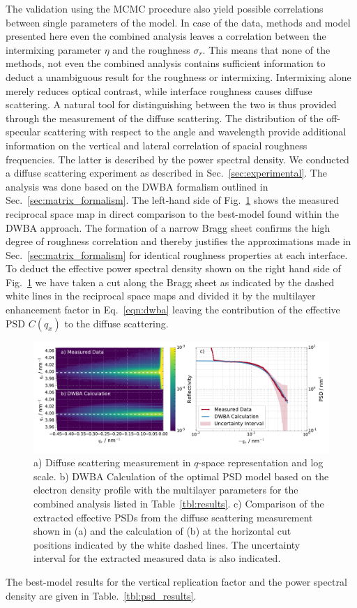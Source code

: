 \documentclass{iucr}              %
\begin{document}
The validation using the MCMC procedure also yield possible correlations between single parameters of the model. In case of the data, methods and model presented here even the combined analysis leaves a correlation between the intermixing parameter $\eta$ and the roughness $\sigma_r$. This means that none of the methods, not even the combined analysis contains sufficient information to deduct a unambiguous result for the roughness or intermixing. Intermixing alone merely reduces optical contrast, while interface roughness causes diffuse scattering. A natural tool for distinguishing between the two is thus provided through the measurement of the diffuse scattering. The distribution of the off-specular scattering with respect to the angle and wavelength provide additional information on the vertical and lateral correlation of spacial roughness frequencies. The latter is described by the power spectral density. We conducted a diffuse scattering experiment as described in Sec.~\ref{sec:experimental}. The analysis was done based on the DWBA formalism outlined in Sec.~\ref{sec:matrix_formalism}. The left-hand side of Fig.~\ref{fig:diffuse_meas} shows the measured reciprocal space map in direct comparison to the best-model found within the DWBA approach. The formation of a narrow Bragg sheet \cite{Haase:14,PhysRevLett.73.2228} confirms the high degree of roughness correlation and thereby justifies the approximations made in Sec.~\ref{sec:matrix_formalism} for identical roughness properties at each interface. To deduct the effective power spectral density shown on the right hand side of Fig.~\ref{fig:diffuse_meas} we have taken a cut along the Bragg sheet as indicated by the dashed white lines in the reciprocal space maps and divided it by the multilayer enhancement factor in Eq.~\ref{eqn:dwba} leaving the contribution of the effective PSD $C(q_x)$ to the diffuse scattering.
\onecolumn
\begin{figure}
  \centering
  \includegraphics[width=\textwidth]{images/diffuse_incl_psd}
  \caption{a) Diffuse scattering measurement in $q$-space representation and log scale. b) DWBA Calculation of the optimal PSD model based on the electron density profile with the multilayer parameters for the combined analysis listed in Table~\ref{tbl:results}. c) Comparison of the extracted effective PSDs from the diffuse scattering measurement shown in (a) and the calculation of (b) at the horizontal cut positions indicated by the white dashed lines. The uncertainty interval for the extracted measured data is also indicated.}
  \label{fig:diffuse_meas}
\end{figure}
\twocolumn
The best-model results for the vertical replication factor and the power spectral density are given in Table.~\ref{tbl:psd_results}.
\end{document}
